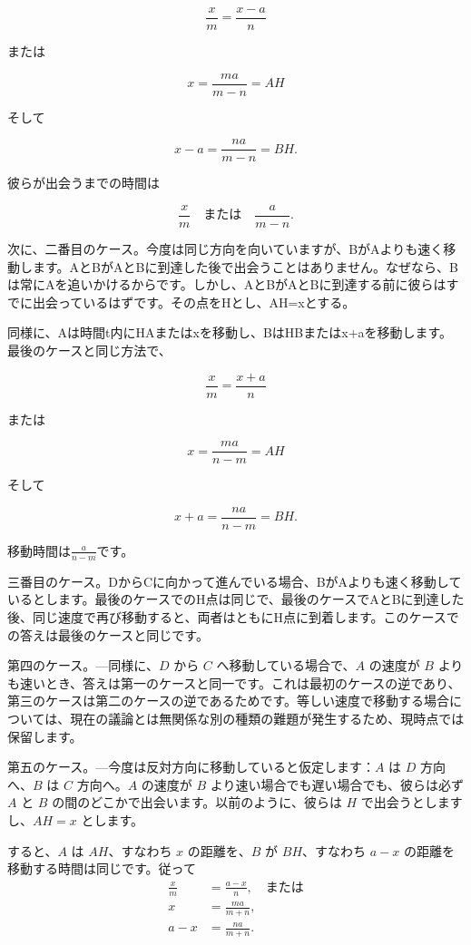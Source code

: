 \documentclass[a4paper,11pt,openany]{ltjsbook}
\begin{document}
\[
\frac{x}{m} = \frac{x - a}{n}
\]

または

\[
x = \frac{ma}{m - n} = AH
\]

そして

\[
x - a = \frac{na}{m - n} = BH.
\]

彼らが出会うまでの時間は

\[
\frac{x}{m} \quad\text{または}\quad \frac{a}{m - n}.
\]

次に、二番目のケース。今度は同じ方向を向いていますが、BがAよりも速く移動します。AとBがAとBに到達した後で出会うことはありません。なぜなら、Bは常にAを追いかけるからです。しかし、AとBがAとBに到達する前に彼らはすでに出会っているはずです。その点をHとし、AH=xとする。

同様に、Aは時間t内にHAまたはxを移動し、BはHBまたはx+aを移動します。最後のケースと同じ方法で、

\[
\frac{x}{m} = \frac{x + a}{n}
\]

または

\[
x = \frac{ma}{n - m} = AH
\]

そして

\[
x + a = \frac{na}{n - m} = BH.
\]

移動時間は\(\frac{a}{n - m}\)です。

三番目のケース。DからCに向かって進んでいる場合、BがAよりも速く移動しているとします。最後のケースでのH点は同じで、最後のケースでAとBに到達した後、同じ速度で再び移動すると、両者はともにH点に到着します。このケースでの答えは最後のケースと同じです。

第四のケース。---同様に、$D$ から $C$ へ移動している場合で、$A$ の速度が $B$ よりも速いとき、答えは第一のケースと同一です。これは最初のケースの逆であり、第三のケースは第二のケースの逆であるためです。等しい速度で移動する場合については、現在の議論とは無関係な別の種類の難題が発生するため、現時点では保留します。

第五のケース。---今度は反対方向に移動していると仮定します：$A$ は $D$ 方向へ、$B$ は $C$ 方向へ。$A$ の速度が $B$ より速い場合でも遅い場合でも、彼らは必ず $A$ と $B$ の間のどこかで出会います。以前のように、彼らは $H$ で出会うとしますし、$AH = x$ とします。

すると、$A$ は $AH$、すなわち $x$ の距離を、$B$ が $BH$、すなわち $a - x$ の距離を移動する時間は同じです。従って
\begin{align*}
    \frac{x}{m} &= \frac{a - x}{n}, \quad\text{または} \\
    x &= \frac{ma}{m + n}, \\
    a - x &= \frac{na}{m + n}.
\end{align*}
\end{document}
